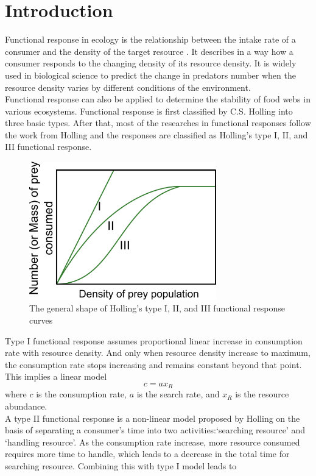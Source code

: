 \documentclass{article}[11pt,a4,twosided,doublespacing,titlepagenumber=on,numbers=endperiod]
\begin{document}
\section{Introduction}
\doublespacing
Functional response in ecology is the relationship between the intake rate of a consumer and the density of the target resource \cite{solomon1949natural}. It describes in a way how a consumer responds to the changing density of its resource density. It is widely used in biological science to predict the change in predators number when the resource density varies by different conditions of the environment. \\
\noindent
Functional response can also be applied to determine the stability of food webs in various ecosystems. Functional response is first classified by C.S. Holling \cite{holling1959components} into three basic types. After that, most of the researches in functional responses follow the work from Holling and the responses are classified as Holling's type I, II, and III functional response.
\begin{figure}[H]
\centering
\includegraphics[height= 60mm]{../Data/FR.pdf}
\renewcommand\thefigure{\arabic{figure}}
\setcounter{figure}{0}
\caption{The general shape of Holling's type I, II, and III functional response curves}
\end{figure}
\noindent Type I functional response assumes proportional linear increase in consumption rate with resource density. And only when resource density increase to maximum, the consumption rate stops increasing and remains constant beyond that point. This implies a linear model
\begin{equation}
    c = a x_R
\end{equation}
where $c$ is the consumption rate, $a$ is the search rate, and $x_R$ is the resource abundance.\\
\noindent
A type II functional response is a non-linear model proposed by Holling on the basis of separating a consumer's time into two activities:`searching resource' and `handling resource'\cite{dawes2013derivation}. As the consumption rate increase, more resource consumed requires more time to handle, which leads to a decrease in the total time for searching resource. Combining this with type I model leads to 
\end{document}
